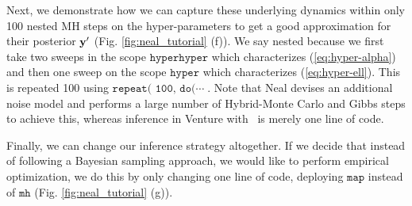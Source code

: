 Next, we demonstrate how we can capture these underlying dynamics within only
100  nested \ac{MH} steps on the hyper-parameters to get a good approximation
for their posterior $\mathbf{y}^\prime$ (Fig. \ref{fig:neal_tutorial} (f)).
We say nested because we first take two sweeps in the scope
$\texttt{hyperhyper}$ which characterizes (\ref{eq:hyper-alpha}) and then one
sweep on the scope $\texttt{hyper}$ which characterizes (\ref{eq:hyper-ell}).
This is repeated 100 using $\texttt{repeat( 100, do(}\cdots\;$.
Note that Neal devises an additional noise model and performs a large number of Hybrid-Monte Carlo and Gibbs steps to achieve this, whereas inference in Venture with \gpmem\ is merely one line of code. 

Finally, we can change our inference strategy altogether. If we decide that instead of
following a Bayesian sampling approach, we would like to perform empirical optimization,
we do this by only changing one line of code, deploying $\texttt{map}$ instead
of $\texttt{mh}$ (Fig. \ref{fig:neal_tutorial} (g)). 


